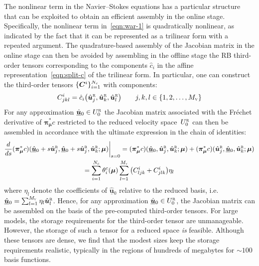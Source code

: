 \documentclass[onecolumn, twoside, a4paper, 11pt]{article}
\begin{document}
The nonlinear term in the Navier--Stokes equations has a particular structure that can be exploited to obtain an efficient assembly in the online stage. Specifically, the nonlinear term in~\eqref{eqn:war-1} is quadratically nonlinear, as indicated by the fact that it can be represented as a trilinear form with a repeated argument. The
quadrature-based assembly of the Jacobian matrix in the online stage can then be avoided by assembling in the
offline stage the RB third-order tensors corresponding to the components $\hat{c}_i$ in the affine representation~\eqref{eqn:split-c} of the trilinear form.
In particular, one can construct the third-order tensors $\smash[t]{\{{\bm C}^i\}_{i=1}^{N_c}}$ with components:
%
\begin{equation}
  C^i_{jkl} = \hat{c}{}_i\big(\hat{\bm u}^\textsc{r}_j, \hat{\bm u}^\textsc{r}_k, \hat{\bm u}^\textsc{r}_l\big)
  \qquad
  j,k,l\in\{1,2,\ldots,M_{\textsc{v}}\}
  \label{eqn:tensor}
\end{equation}
%
For any approximation $\underline{\hat{\bm u}}{}_0\in{}U_0^{\textsc{r}}$ the Jacobian matrix associated with the
Fr\'echet derivative of $\bm\pi_{\bm\mu}^* c$ restricted to the reduced velocity space~$U_0^{\textsc{r}}$ can then be assembled in accordance with the ultimate expression in the chain of identities:
%
\begin{multline}
\frac{d}{ds}(\bm\pi_{\bm\mu}^* c)(\underline{\hat{\bm u}}{}_0+s\hat{\bm u}^\textsc{r}_j,\underline{\hat{\bm u}}{}_0+s\hat{\bm u}^\textsc{r}_j,\hat{\bm u}^\textsc{r}_k;\bm \mu)\bigg|_{s=0}
=
(\bm\pi_{\bm\mu}^* c)(\underline{\hat{\bm u}}{}_0,\hat{\bm u}^\textsc{r}_j,\hat{\bm u}^\textsc{r}_k;\bm \mu)
+
(\bm\pi_{\bm\mu}^* c)(\hat{\bm u}^\textsc{r}_j,\underline{\hat{\bm u}}{}_0,\hat{\bm u}^\textsc{r}_k;\bm \mu)
\\
=
\sum_{i=1}^{N_c}\theta^c_i(\bm\mu)
\sum_{l=1}^{M_{\textsc{v}}}
\big(C^i_{ljk}+C^i_{jlk}\big)\eta_l
\end{multline}
%
where $\eta_l$ denote the coefficients of $\underline{\hat{\bm u}}{}_0$ relative to the reduced basis, i.e.
$\underline{\hat{\bm u}}{}_0=\sum_{l=1}^{M_{\textsc{v}}}\eta_l\hat{\bm u}^\textsc{r}_l$. Hence, for any
approximation $\underline{\hat{\bm u}}{}_0\in{}U^{\textsc{r}}_0$, the Jacobian matrix can be assembled on the
basis of the pre-computed third-order tensors. For large models, the storage requirements for the third-order
tensor are unmanageable. However, the storage of such a tensor for a reduced space {\em is\/} feasible.
Although these tensors are dense, we find that the modest sizes keep the storage requirements realistic,
typically in the regions of hundreds of megabytes for $\sim100$ basis
functions.
\end{document}
